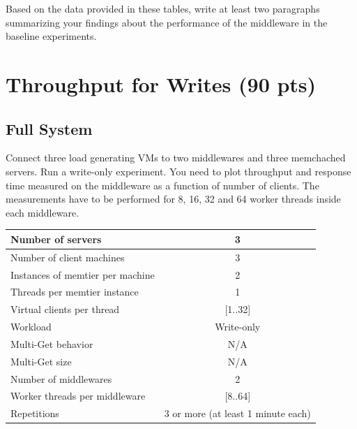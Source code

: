\documentclass[11pt,a4paper]{article}
\begin{document}
Based on the data provided in these tables, write at least two paragraphs summarizing your findings about the performance of the middleware in the baseline experiments.

\section{Throughput for Writes (90 pts)}

\subsection{Full System}

Connect three load generating VMs to two middlewares and three memchached servers. Run a write-only experiment. 
You need to plot throughput and response time measured on the middleware as a function of number of clients. The measurements have to be performed for 8, 16, 32 and 64 worker threads inside each middleware.

\begin{center}
	\scriptsize{
		\begin{tabular}{|l|c|}
			\hline Number of servers                & 3          \\ 
			\hline Number of client machines        & 3          \\ 
			\hline Instances of memtier per machine & 2          \\ 
			\hline Threads per memtier instance     & 1          \\
			\hline Virtual clients per thread       & [1..32]    \\ 
			\hline Workload                         & Write-only \\
			\hline Multi-Get behavior               & N/A        \\
			\hline Multi-Get size                   & N/A        \\
			\hline Number of middlewares            & 2          \\
			\hline Worker threads per middleware    & [8..64]    \\
			\hline Repetitions                      & 3 or more (at least 1 minute each)  \\ 
			\hline 
		\end{tabular}
	} 
\end{center}
\end{document}
